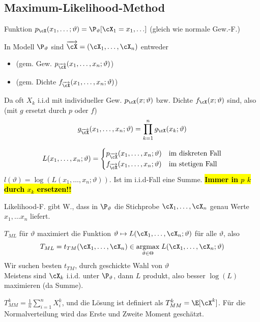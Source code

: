 \subsection{Maximum-Likelihood-Method}
{\scriptsize Funktion $p_\cX(x_1, \ldots; \vartheta) = \P_\vartheta[\cX_1 = x_1, \ldots]$ (gleich wie normale Gew.-F.)}

In Modell $\P_\vartheta$ sind $\overrightarrow{\cX} = (\cX_1, \ldots, \cX_n)$ entweder
\begin{itemize}
    \item {} (gem. Gew. $p_{\overrightarrow{\cX}} (x_1, \ldots, x_n; \vartheta)$)
    \item {} (gem. Dichte $f_{\overrightarrow{\cX}} (x_1, \ldots, x_n; \vartheta)$)
\end{itemize}
Da oft $X_k$ i.i.d mit individueller Gew. $p_\cX(x; \vartheta)$ bzw. Dichte $f_\cX(x; \vartheta)$ sind, also (mit $g$ ersetzt durch $p$ oder $f$)
\[
    g_{\overrightarrow{\cX}}(x_1, \ldots, x_n; \vartheta) = \prod_{k = 1}^n g_\cX(x_k; \vartheta)
\]

\[
    L(x_1, \ldots, x_n; \vartheta) = \begin{cases}
        p_{\overrightarrow{\cX}}(x_1, \ldots, x_n; \vartheta) & \text{im diskreten Fall} \\
        f_{\overrightarrow{\cX}}(x_1, \ldots, x_n; \vartheta) & \text{im stetigen Fall}
    \end{cases}
\]
 $l(\vartheta) = \log(L(x_1, \ldots, x_n; \vartheta))$. Ist im i.i.d-Fall eine Summe. \hl{\textbf{Immer in $p$ $k$ durch $x_k$ ersetzen!!}}

\inlineintuition Likelihood-F. gibt W., dass in $\P_\vartheta$ die Stichprobe $\cX_1, \ldots, \cX_n$ genau Werte $x_1, \ldots x_n$ liefert.

\shortdefinition[ML-Schätzer] $T_{ML}$ für $\vartheta$ maximiert die Funktion $\vartheta \mapsto L(\cX_1, \ldots, \cX_n; \vartheta)$ für alle $\vartheta$, also
\[
    T_{ML} = t_{TM}(\cX_1, \ldots, \cX_n) \in \underset{\vartheta \in \Theta}{\text{argmax}}\; L(\cX_1, \ldots, \cX_n; \vartheta)
\]
{\scriptsize Wir suchen besten $t_{TM}$, durch geschickte Wahl von $\vartheta$}\\
Meistens sind $\cX_k$ i.i.d. unter $\P_\vartheta$, dann $L$ produkt, also besser $\log(L)$ maximieren (da Summe).

\shortdefinition[Momentschätzer (MM)] $T_{MM}^k = \frac{1}{n} \sum_{i = 1}^{n} X_i^k$,
und die Lösung ist definiert als $T_{MM}^k = \E[\cX^k]$. Für die Normalverteilung wird das Erste und Zweite Moment geschätzt.

